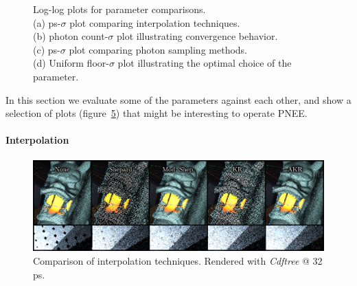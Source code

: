 \begin{figure}
    \centering
    \begin{subfigure}{.25\textwidth}
      \centering
        \caption{}
        \label{fig:intmain}
    \end{subfigure}%
    \begin{subfigure}{.25\textwidth}
        \caption{}
        \label{fig:pcplot}
    \end{subfigure}%
    \begin{subfigure}{.25\textwidth}
        \caption{}
        \label{fig:unipowplot}
    \end{subfigure}%
    \begin{subfigure}{.25\textwidth}
        \caption{}
        \label{fig:unifloorplot}
    \end{subfigure}
    \caption{Log-log plots for parameter comparisons. \\
    (a) ps-$\sigma$ plot comparing interpolation techniques. \\
    (b) photon count-$\sigma$ plot illustrating convergence behavior. \\
    (c) ps-$\sigma$ plot comparing photon sampling methods. \\
    (d) Uniform floor-$\sigma$ plot illustrating the optimal choice of the parameter.}
    \label{fig:parammain}
\end{figure}
In this section we evaluate some of the parameters against each other, and show a selection of plots (figure~\ref{fig:parammain}) that might be interesting to operate PNEE.

\paragraph{Interpolation}

\begin{figure}
    \centering
    \includegraphics[width=1\textwidth]{figures/comparisons/int_comp.pdf}
    \caption{Comparison of interpolation techniques. Rendered with \textit{Cdftree} @ 32 ps.}
    \label{fig:intcomp}
\end{figure}

